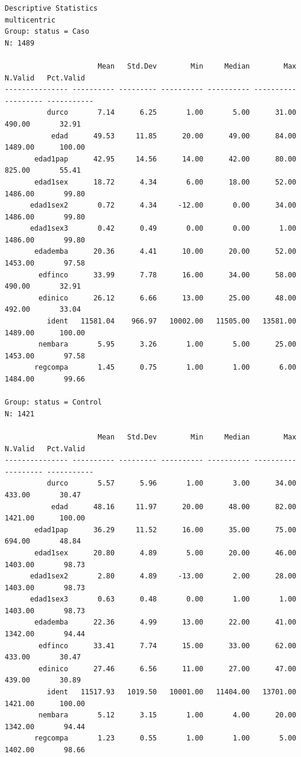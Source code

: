 \documentclass[
]{book}
\begin{document}
\begin{verbatim}
Descriptive Statistics  
multicentric  
Group: status = Caso  
N: 1489  

                      Mean   Std.Dev        Min     Median        Max   N.Valid   Pct.Valid
--------------- ---------- --------- ---------- ---------- ---------- --------- -----------
          durco       7.14      6.25       1.00       5.00      31.00    490.00       32.91
           edad      49.53     11.85      20.00      49.00      84.00   1489.00      100.00
       edad1pap      42.95     14.56      14.00      42.00      80.00    825.00       55.41
       edad1sex      18.72      4.34       6.00      18.00      52.00   1486.00       99.80
      edad1sex2       0.72      4.34     -12.00       0.00      34.00   1486.00       99.80
      edad1sex3       0.42      0.49       0.00       0.00       1.00   1486.00       99.80
       edademba      20.36      4.41      10.00      20.00      52.00   1453.00       97.58
        edfinco      33.99      7.78      16.00      34.00      58.00    490.00       32.91
        edinico      26.12      6.66      13.00      25.00      48.00    492.00       33.04
          ident   11581.04    966.97   10002.00   11505.00   13581.00   1489.00      100.00
        nembara       5.95      3.26       1.00       5.00      25.00   1453.00       97.58
       regcompa       1.45      0.75       1.00       1.00       6.00   1484.00       99.66

Group: status = Control  
N: 1421  

                      Mean   Std.Dev        Min     Median        Max   N.Valid   Pct.Valid
--------------- ---------- --------- ---------- ---------- ---------- --------- -----------
          durco       5.57      5.96       1.00       3.00      34.00    433.00       30.47
           edad      48.16     11.97      20.00      48.00      82.00   1421.00      100.00
       edad1pap      36.29     11.52      16.00      35.00      75.00    694.00       48.84
       edad1sex      20.80      4.89       5.00      20.00      46.00   1403.00       98.73
      edad1sex2       2.80      4.89     -13.00       2.00      28.00   1403.00       98.73
      edad1sex3       0.63      0.48       0.00       1.00       1.00   1403.00       98.73
       edademba      22.36      4.99      13.00      22.00      41.00   1342.00       94.44
        edfinco      33.41      7.74      15.00      33.00      62.00    433.00       30.47
        edinico      27.46      6.56      11.00      27.00      47.00    439.00       30.89
          ident   11517.93   1019.50   10001.00   11404.00   13701.00   1421.00      100.00
        nembara       5.12      3.15       1.00       4.00      20.00   1342.00       94.44
       regcompa       1.23      0.55       1.00       1.00       5.00   1402.00       98.66
\end{verbatim}
\end{document}
